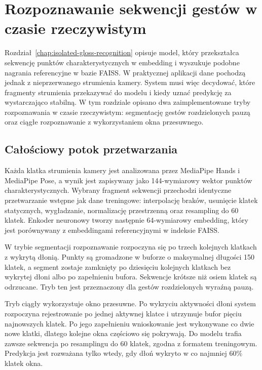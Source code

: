 
\section{Rozpoznawanie sekwencji gestów w czasie rzeczywistym}
\label{chap:sentence-level-translation}

Rozdział~\ref{chap:isolated-gloss-recognition} opisuje model, który
przekształca sekwencję punktów charakterystycznych w embedding i wyszukuje
podobne nagrania referencyjne w bazie FAISS. W praktycznej aplikacji dane
pochodzą jednak z nieprzerwanego strumienia kamery. System musi więc
decydować, które fragmenty strumienia przekazywać do modelu i kiedy uznać
predykcję za wystarczająco stabilną. W tym rozdziale opisano dwa
zaimplementowane tryby rozpoznawania w czasie rzeczywistym: segmentację
gestów rozdzielonych pauzą oraz ciągłe rozpoznawanie z wykorzystaniem okna
przesuwnego.

\subsection{Całościowy potok przetwarzania}
\label{sec:sentence-level-pipeline}

Każda klatka strumienia kamery jest analizowana przez MediaPipe Hands i
MediaPipe Pose, a wynik jest zapisywany jako 144-wymiarowy wektor punktów
charakterystycznych. Wybrany fragment sekwencji przechodzi identyczne
przetwarzanie wstępne jak dane treningowe: interpolację braków, usunięcie
klatek statycznych, wygładzanie, normalizację przestrzenną oraz resampling
do 60 klatek. Enkoder neuronowy tworzy następnie 64-wymiarowy embedding,
który jest porównywany z embeddingami referencyjnymi w indeksie FAISS.

W trybie segmentacji rozpoznawanie rozpoczyna się po trzech kolejnych klatkach
z wykrytą dłonią. Punkty są gromadzone w buforze o maksymalnej długości
150 klatek, a segment zostaje zamknięty po dziesięciu kolejnych klatkach bez
wykrytej dłoni albo po zapełnieniu bufora. Sekwencje krótsze niż osiem klatek
są odrzucane. Tryb ten jest przeznaczony dla gestów rozdzielonych wyraźną pauzą.

Tryb ciągły wykorzystuje okno przesuwne. Po wykryciu aktywności dłoni system
rozpoczyna rejestrowanie po jednej aktywnej klatce i utrzymuje bufor pięciu
najnowszych klatek. Po jego zapełnieniu wnioskowanie jest wykonywane co dwie
nowe klatki, dlatego kolejne okna częściowo się pokrywają. Do modelu trafia
zawsze sekwencja po resamplingu do 60 klatek, zgodna z formatem treningowym.
Predykcja jest rozważana tylko wtedy, gdy dłoń wykryto w co najmniej $60\%$
klatek okna.

